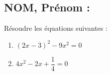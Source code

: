 \documentclass[a4paper,11pt,exos]{nsi}
\begin{document}
\subsection*{NOM, Prénom : \dotfill} 


\maketitle




\begin{exercice}
    Résoudre les équations suivantes :
    \begin{multicols}{2}
        \begin{enumerate}
            \item $(2x-3)^2-9x^2=0$
	        \item $4x^2-2x+\dfrac{1}{4}=0$
        \end{enumerate}
    \end{multicols}
    
\end{exercice}

\end{document}
